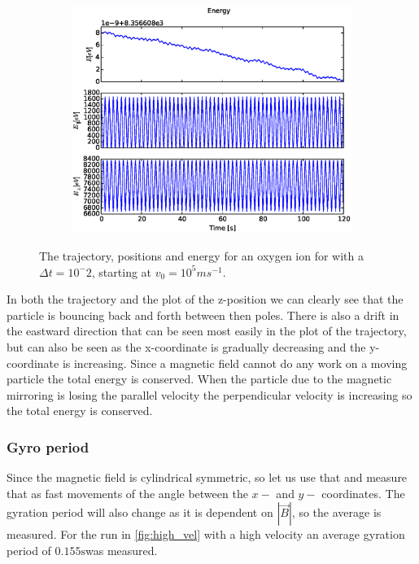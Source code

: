 \documentclass[x11names]{article}
\renewcommand{\va}{\vec}
\begin{document}
\begin{figure}[ht]
\begin{subfigure}{0.33\textwidth}
        \includegraphics[width = \textwidth]{figures/rk4_E_6_2}
      \end{subfigure}
      \caption{The trajectory, positions and energy for an oxygen ion for with a \(\Delta t = 10^-2\), starting at \(v_0 = 10^5 \si{ms^{-1} }\).}
      \label{fig:results}
    \end{figure}

    In both the trajectory and the plot of the z-position we can clearly see that the particle is bouncing back and forth between then poles. There is also a drift in the eastward direction that can be seen most easily in the plot of the trajectory, but can also be seen as the x-coordinate is gradually decreasing and the y-coordinate is increasing. Since a magnetic field cannot do any work on a moving particle the total energy is conserved. When the particle due to the magnetic mirroring is losing the parallel velocity the perpendicular velocity is increasing so the total energy is conserved. 


    \subsubsection{Gyro period}
    Since the magnetic field is cylindrical symmetric, so let us use that and measure that as fast movements of the angle between the \(x-\) and \(y-\) coordinates. The gyration period will also change as it is dependent on \(|\va{B}|\), so the average is measured. For the run in \cref{fig:high_vel} with a high velocity an average gyration period of \( 0.155 \si{\second}\)was measured.
\end{document}
